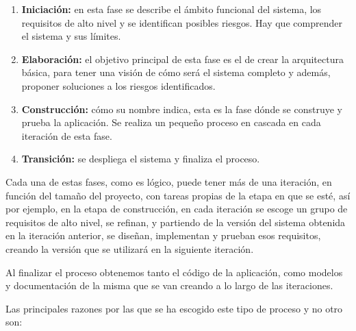 \begin{enumerate}

	\item \textbf{Iniciación:} en esta fase se describe el ámbito funcional del sistema, los requisitos de alto nivel y se identifican posibles riesgos. Hay que comprender el sistema y sus límites.

	\item \textbf{Elaboración:} el objetivo principal de esta fase es el de crear la arquitectura básica, para tener una visión de cómo será el sistema completo y además, proponer soluciones a los riesgos identificados.

	\item \textbf{Construcción:} cómo su nombre indica, esta es la fase dónde se construye y prueba la aplicación. Se realiza un pequeño proceso en cascada en cada iteración de esta fase.

	\item \textbf{Transición:} se despliega el sistema y finaliza el proceso.

\end{enumerate}

Cada una de estas fases, como es lógico, puede tener más de una iteración, en función del tamaño del proyecto, con tareas propias de la etapa en que se esté, así por ejemplo, en la etapa de construcción, en cada iteración se escoge un grupo de requisitos de alto nivel, se refinan, y partiendo de la versión del sistema obtenida en la iteración anterior, se diseñan, implementan y prueban esos requisitos, creando la versión que se utilizará en la siguiente iteración.
\newline

Al finalizar el proceso obtenemos tanto el código de la aplicación, como modelos y documentación de la misma que se van creando a lo largo de las iteraciones.
\newline
{}



Las principales razones por las que se ha escogido este tipo de proceso y no otro son:

